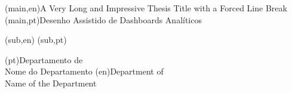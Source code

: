 
%


\nttitle(main,en){A Very Long and Impressive Thesis Title with a Forced Line Break}%
\nttitle(main,pt){Desenho Assistido de Dashboards Analíticos}%

\nttitle(sub,en){}%
\nttitle(sub,pt){}%


\ntdepartment*(pt){Departamento de\\Nome do Departamento}
\ntdepartment*(en){Department of\\Name of the Department}

